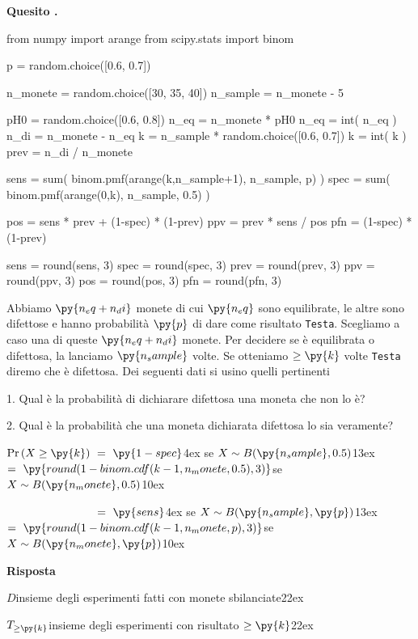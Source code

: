 \documentclass[11pt,twoside,a4paper]{article}
\def\Pr{{\rm Pr\,}}
\newcounter{quesito}
\newenvironment{question}{\bigskip\addtocounter{quesito}{1}\par\textbf{Quesito \thequesito.}}{\vspace{\parskip}}
\newenvironment{answer}{\par\textbf{Risposta\quad}}{\vspace{\parskip}}
\begin{document}
\begin{question}
\def\Pr{{\rm Pr\,}}
\begin{pycode}
from numpy import arange
from scipy.stats import binom

p = random.choice([0.6, 0.7])

n_monete = random.choice([30, 35, 40])
n_sample = n_monete - 5

pH0 = random.choice([0.6, 0.8])
n_eq = n_monete * pH0
n_eq = int( n_eq )
n_di = n_monete - n_eq
k = n_sample * random.choice([0.6, 0.7])
k = int( k )
prev = n_di / n_monete


sens = sum( binom.pmf(arange(k,n_sample+1), n_sample, p) )
spec = sum( binom.pmf(arange(0,k), n_sample, 0.5) )

pos =  sens * prev + (1-spec) * (1-prev)
ppv =  prev * sens  / pos
pfn =  (1-spec) * (1-prev) 

sens = round(sens, 3)
spec = round(spec, 3)
prev = round(prev, 3)
ppv = round(ppv, 3)
pos = round(pos, 3)
pfn = round(pfn, 3)
\end{pycode}
Abbiamo $\py{n_eq+n_di}$ monete di cui $\py{n_eq}$ sono equilibrate, le altre sono difettose e hanno probabilità $\py{p}$ di dare come risultato {\tt Testa}. Scegliamo a caso una di queste $\py{n_eq+n_di}$ monete. Per decidere se è equilibrata o difettosa, la lanciamo $\py{n_sample}$ volte. Se otteniamo $\ge\py{k}$ volte {\tt Testa\/} diremo che è difettosa. Dei seguenti dati si usino quelli pertinenti

1. Qual è la probabilità di dichiarare difettosa una moneta che non lo è? 

2. Qual è la probabilità che una moneta dichiarata difettosa lo sia veramente?


$\Pr(X\ge \py{k})\ =\ \py{1-spec}$\kern4ex se $X\sim B(\py{n_sample},0.5)$\kern13ex%
$=\ \py{round(1-binom.cdf(k-1, n_monete,0.5), 3)}$\hfill se $X\sim B(\py{n_monete},0.5)$\kern10ex

$\phantom{\Pr(X\ge \py{k})}\ =\ \py{sens}$\kern4ex se $X\sim B(\py{n_sample},\py{p})$\kern13ex%
$=\ \py{round(1-binom.cdf(k-1, n_monete,  p), 3)}$\hfill se $X\sim B(\py{n_monete},\py{p})$\kern10ex






\begin{answer}

$D$\hfill insieme degli esperimenti fatti con monete sbilanciate\kern22ex

$T_{\ge\py{k}}$\hfill insieme degli esperimenti con risultato $\ge\py{k}$\kern22ex


\end{answer}
\end{question}
\end{document}

